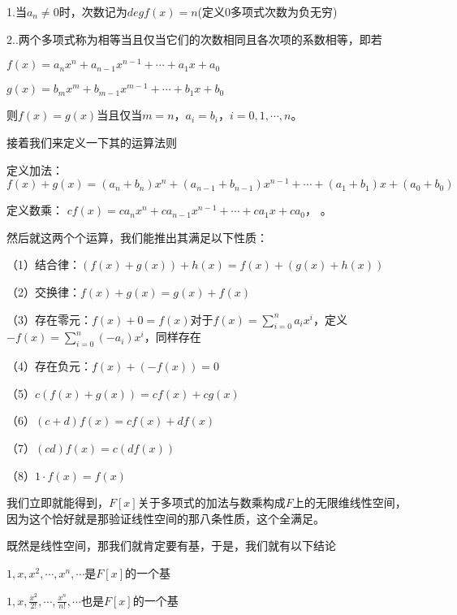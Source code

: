 \documentclass[lang=cn,10pt]{elegantbook}
\begin{document}
1.当$a_n\neq0$时，次数记为$deg{f}(x)=n$(定义0多项式次数为负无穷)

2..两个多项式称为相等当且仅当它们的次数相同且各次项的系数相等，即若

$f(x)=a_nx^n+a_{n-1}x^{n-1}+\cdots+a_1x+a_0$

$g(x)=b_mx^m+b_{m-1}x^{m-1}+\cdots+b_1x+b_0$

则$f(x)=g(x)$当且仅当$m=n$，$a_i=b_i，i=0,1,\cdots,n$。

接着我们来定义一下其的运算法则
\begin{definition}[加法和数乘]
	定义加法：$f(x)+g(x)=(a_n+b_n)x^n+(a_{n-1}+b_{n-1})x^{n-1}+\cdots+(a_1+b_1)x+(a_0+b_0)$
	
	定义数乘：
	$cf(x)=ca_nx^n+ca_{n-1}x^{n-1}+\cdots+ca_1x+ca_0$， 
	。
\end{definition}
然后就这两个个运算，我们能推出其满足以下性质：
\begin{conclusion}
	（1）结合律：$(f(x)+g(x))+h(x)=f(x)+(g(x)+h(x))$
	
	（2）交换律：$f(x)+g(x)=g(x)+f(x)$
	
	（3）存在零元：$f(x)+0=f(x)
	对于f(x)=\sum_{i=0}^{n}{a_ix^i}$，定义$-f(x)=\sum_{i=0}^{n}{(-a_i)x^i}$，同样存在
	
	（4）存在负元：$f(x)+(-f(x))=0$
	
	（5）$c(f(x)+g(x))=cf(x)+cg(x)$
	
	（6）$(c+d)f(x)=cf(x)+df(x)$
	
	（7）$(cd)f(x)=c(df(x))$
	
	（8）$1\cdot f(x)=f(x) $
\end{conclusion}
我们立即就能得到，$F[x]$关于多项式的加法与数乘构成$F$上的无限维线性空间，因为这个恰好就是那验证线性空间的那八条性质，这个全满足。

既然是线性空间，那我们就肯定要有基，于是，我们就有以下结论
\begin{conclusion}
	$1,x,x^2,\cdots,x^n,\cdots$是$F[x]$的一个基
	
$	1,x,\frac{x^2}{2!},\cdots,\frac{x^n}{n!},\cdots$也是$F[x]$的一个基
\end{conclusion}
\end{document}
